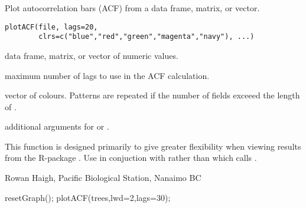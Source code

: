 \documentclass[letterpaper]{book}
\begin{document}
\begin{Description}\relax
Plot autocorrelation bars (ACF) from a data frame, matrix, or vector.
\end{Description}
\begin{Usage}
\begin{verbatim}
plotACF(file, lags=20, 
        clrs=c("blue","red","green","magenta","navy"), ...)
\end{verbatim}
\end{Usage}
\begin{Arguments}
\begin{ldescription}
\item[\code{file}] data frame, matrix, or vector of numeric values.
\item[\code{lags}] maximum number of lags to use in the ACF calculation.
\item[\code{clrs}] vector of colours. Patterns are repeated if the number 
of fields exceeed the length of .
\item[\code{...}] additional arguments for  or .
\end{ldescription}
\end{Arguments}
\begin{Details}\relax
This function is designed primarily to give greater flexibility when viewing 
results from the R-package . Use  in conjuction with 
 rather than  
which calls .
\end{Details}
\begin{Author}\relax
Rowan Haigh, Pacific Biological Station, Nanaimo BC
\end{Author}
\begin{Examples}
\begin{ExampleCode}
resetGraph(); plotACF(trees,lwd=2,lags=30);
\end{ExampleCode}
\end{Examples}
\end{document}
